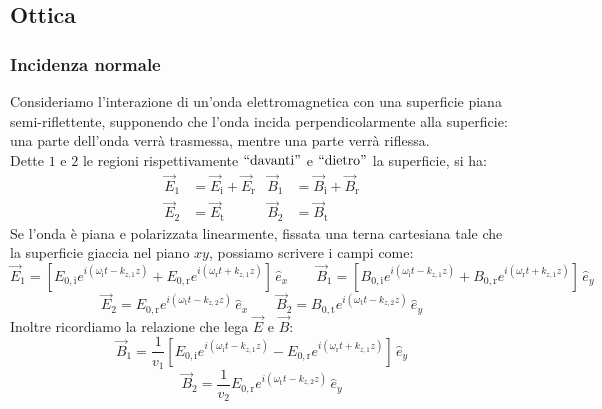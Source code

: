 \documentclass[]{article}
\begin{document}
\subsection{Ottica}

\newcommand{\inc}{\text{i}}
\newcommand{\tr}{\text{t}}
\newcommand{\rif}{\text{r}}

\subsubsection{Incidenza normale}

Consideriamo l'interazione di un'onda elettromagnetica con una superficie piana semi-riflettente, supponendo che l'onda incida perpendicolarmente alla superficie: una parte dell'onda verrà trasmessa, mentre una parte verrà riflessa. \\ 
Dette $ 1 $ e $ 2 $ le regioni rispettivamente $ ``\text{davanti}" $ e $ ``\text{dietro}" $ la superficie, si ha:
\begin{align}
	\vec{E}_1 &= \vec{E}_{\text{i}} + \vec{E}_{\text{r}} & \vec{B}_1 &= \vec{B}_{\text{i}} + \vec{B}_{\text{r}} \\ 
	\vec{E}_2 &= \vec{E}_{\text{t}} & \vec{B}_2 &= \vec{B}_{\text{t}}
	\label{eq:47-48}
\end{align}
Se l'onda è piana e polarizzata linearmente, fissata una terna cartesiana tale che la superficie giaccia nel piano $ xy $, possiamo scrivere i campi come:
\begin{equation}
	\vec{E}_1 = \left[E_{0,\text{i}} e^{i(\omega_{\inc} t - k_{z,1} z)} + E_{0,\rif} e^{i(\omega_{\rif} t + k_{z,1} z)} \right]\,\hat{e}_x \qquad \vec{B}_1 = \left[B_{0,\text{i}} e^{i(\omega_{\inc} t - k_{z,1} z)} + B_{0,\rif} e^{i(\omega_{\rif} t + k_{z,1} z)} \right]\,\hat{e}_y
	\label{eq:49}
\end{equation}
\begin{equation}
	\vec{E}_2 = E_{0,\rif} e^{i(\omega_{\tr} t - k_{z,2} z)}\,\hat{e}_x \qquad \vec{B}_2 = B_{0,\tr} e^{i(\omega_{\tr} t - k_{z,2} z)}\,\hat{e}_y
	\label{eq:50}
\end{equation}
Inoltre ricordiamo la relazione che lega $ \vec{E} $ e $ \vec{B} $:
\begin{equation}
	\vec{B}_1 = \frac{1}{v_1} \left[E_{0,\text{i}} e^{i(\omega_{\inc} t - k_{z,1} z)} - E_{0,\rif} e^{i(\omega_{\rif} t + k_{z,1} z)} \right]\,\hat{e}_y
	\label{eq:51}
\end{equation}
\begin{equation}
	\vec{B}_2 = \frac{1}{v_2} E_{0,\rif} e^{i(\omega_{\tr} t - k_{z,2} z)}\,\hat{e}_y
	\label{eq:52}
\end{equation}
\end{document}
